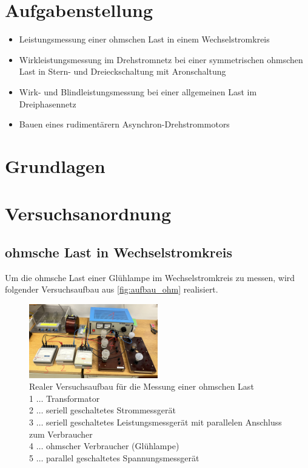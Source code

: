 \documentclass[12pt,english,ngerman]{scrartcl}
\begin{document}
%
\tableofcontents
\newpage

\section{Aufgabenstellung\label{Auf}}

\begin{itemize}
	\item Leistungsmessung einer ohmschen Last in einem Wechselstromkreis
	\item Wirkleistungsmessung im Drehstromnetz bei einer symmetrischen ohmschen Last in Stern- und Dreieckschaltung mit Aronschaltung
	\item Wirk- und Blindleistungsmessung bei einer allgemeinen Last im Dreiphasennetz
	\item Bauen eines rudimentärern Asynchron-Drehstrommotors
\end{itemize}

\section{Grundlagen}\label{Grund}


\section{Versuchsanordnung}
\label{sec:versuchsanordnung}

\subsection{ohmsche Last in Wechselstromkreis}

Um die ohmsche Last einer Glühlampe im Wechselstromkreis zu messen, wird folgender Versuchsaufbau aus \autoref{fig:aufbau_ohm} realisiert.

\begin{figure}[H]
	\begin{center}
		\includegraphics[width = 0.5\textwidth]{./figures/aufbau_ohm.png}
	\end{center}
	\caption[Realer Versuchsaufbau für die Messung einer ohmschen Last]
	{Realer Versuchsaufbau für die Messung einer ohmschen Last \\
	1 \(\dots\) Transformator  \\
	2 \(\dots\) seriell geschaltetes Strommessgerät  \\
	3 \(\dots\) seriell geschaltetes Leistungsmessgerät mit parallelen Anschluss zum Verbraucher  \\
	4 \(\dots\) ohmscher Verbraucher (Glühlampe)  \\
	5 \(\dots\) parallel geschaltetes Spannungsmessgerät
	}\label{fig:aufbau_ohm}
\end{figure}
\end{document}
